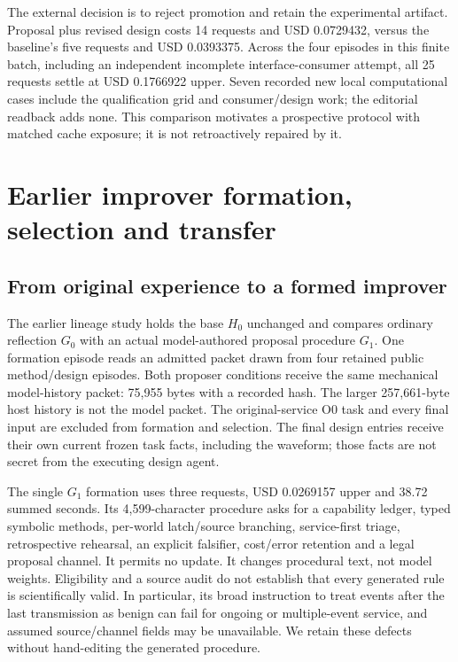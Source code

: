 The external decision is to reject promotion and retain the experimental
artifact. Proposal plus revised design costs 14 requests and USD 0.0729432,
versus the baseline's five requests and USD 0.0393375. Across the four episodes
in this finite batch, including an independent incomplete interface-consumer
attempt, all 25 requests settle at USD 0.1766922 upper. Seven recorded new local
computational cases include the qualification grid and consumer/design work;
the editorial readback adds none. This comparison motivates a prospective
protocol with matched cache exposure; it is not retroactively repaired by it.

\FloatBarrier
\section{Earlier improver formation, selection and transfer}
\label{sec:lineages}
\subsection{From original experience to a formed improver}
The earlier lineage study holds the base $H_0$ unchanged and compares ordinary reflection
$G_0$ with an actual model-authored proposal procedure $G_1$. One formation
episode reads an admitted packet drawn from four retained public method/design
episodes. Both proposer conditions receive the same mechanical model-history
packet: 75,955 bytes with a recorded hash. The larger 257,661-byte host history
is not the model packet. The original-service O0 task and every final input are
excluded from formation and selection. The final design entries receive their
own current frozen task facts, including the waveform; those facts are not
secret from the executing design agent.

The single $G_1$ formation uses three requests, USD 0.0269157 upper and 38.72
summed seconds. Its 4,599-character procedure asks for a capability ledger,
typed symbolic methods, per-world latch/source branching, service-first triage,
retrospective rehearsal, an explicit falsifier, cost/error retention and a
legal proposal channel. It permits no update. It changes procedural text,
not model weights. Eligibility and a source audit do not establish that every
generated rule is scientifically valid. In particular, its broad instruction
to treat events after the last transmission as benign can fail for ongoing or
multiple-event service, and assumed source/channel fields may be unavailable.
We retain these defects without hand-editing the generated procedure.

